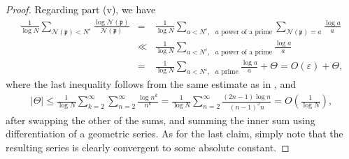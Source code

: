 \documentclass[11pt]{amsart}
\theoremstyle{definition}
\newcommand{\N}{{\mathbb N}}
\newcommand{\NN}{{\mathcal N}}
\newcommand{\mf}{\mathfrak}
\newcommand{\WS}[1]{{\color{blue}{{#1}}}}
\begin{document}
\begin{proof}
Regarding part (v), we have 
\begin{eqnarray*}
    \frac{1}{\log N}\sum_{\NN(\mf p)<N^{\varepsilon}}\frac{\log\NN(\mf p)}{\NN(\mf p)} & = & \frac{1}{\log N}\sum_{a<N^{\varepsilon}, \text{ $a$ power of a prime}}\sum_{\NN(\mf p)=a}\frac{\log a}{a}
   \\&\ll & \frac{1}{\log N}\sum_{a<N^{\varepsilon}, \text{ $a$ power of a prime}}\frac{\log a}{a}\\
  & = & \frac{1}{\log N}\sum_{a<N^{\varepsilon}, \text{ $a$ prime}}\frac{\log a}{a}+\Theta
   =O(\varepsilon)+\Theta,
\end{eqnarray*}
where the last inequality follows from the same estimate as in \cite[p. 247]{E79book}, and 
\begin{equation}\nonumber
    \begin{split}
     \vert\Theta\vert\leq \frac{1}{\log N}\sum_{k=2}^{\infty}\sum_{n=2}^{\infty}\frac{\log n^{k}}{n^{k}}
      = \frac{1}{\log N}\sum_{n=2}^{\infty}\frac{(2n-1)\log n}{(n-1)^2n}=O\left(\frac{1}{\log N}\right),
    \end{split}
\end{equation}
after swapping the other of the sums, and summing the inner sum using differentiation of a geometric series. As for the last claim, simply note that the resulting series is clearly convergent to some absolute constant.
\fi

\end{proof}
\end{document}

